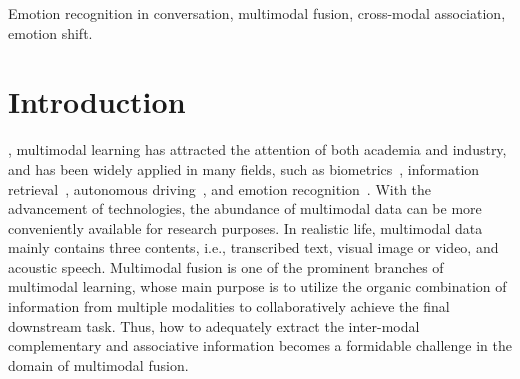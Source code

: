 \documentclass[journal]{IEEEtran}
\begin{document}
\begin{IEEEkeywords}
Emotion recognition in conversation, multimodal fusion, cross-modal association, emotion shift.
\end{IEEEkeywords}

\section{Introduction}
, multimodal learning has attracted the attention of both academia and industry, and has been widely applied in many fields, such as biometrics~\cite{talreja2021deep}, information retrieval~\cite{zhang2022towards}, autonomous driving~\cite{chen2023uamdnet}, and emotion recognition~\cite{he2023multimodal}. With the advancement of technologies, the abundance of multimodal data can be more conveniently available for research purposes. In realistic life, multimodal data mainly contains three contents, i.e., transcribed text, visual image or video, and acoustic speech. Multimodal fusion is one of the prominent branches of multimodal learning, whose main purpose is to utilize the organic combination of information from multiple modalities to collaboratively achieve the final downstream task. Thus, how to adequately extract the inter-modal complementary and associative information becomes a formidable challenge in the domain of multimodal fusion.
\end{document}
